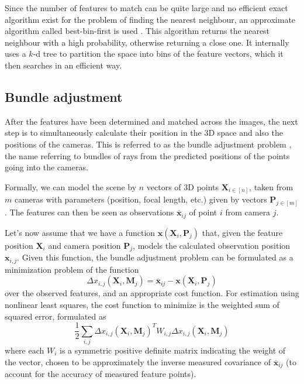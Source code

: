 Since the number of features to match can be quite large and no efficient exact algorithm exist for the problem of finding the nearest neighbour, an approximate algorithm called best-bin-first is used \cite{beis1997shape}.
This algorithm returns the nearest neighbour with a high probability, otherwise returning a close one.
It internally uses a $k$-d tree to partition the space into bins of the feature vectors, which it then searches in an efficient way.

\subsection{Bundle adjustment}
After the features have been determined and matched across the images, the next step is to simultaneously calculate their position in the 3D space and also the positions of the cameras.
This is referred to as the bundle adjustment problem \cite{triggs1999bundle}, the name referring to bundles of rays from the predicted positions of the points going into the cameras.

Formally, we can model the scene by $n$ vectors of 3D points $\mathbf{X}_{i \in [n]}$, taken from $m$ cameras with parameters (position, focal length, etc.) given by vectors $\mathbf{P}_{j \in [m]}$.
The features can then be seen as observations $\overline{\bm{x}}_{ij}$ of point $i$ from camera $j$.

Let's now assume that we have a function $\bm{x}(\mathbf{X}_i, \mathbf{P}_j)$ that, given the feature position $\mathbf{X}_i$ and camera position $\mathbf{P}_j$, models the calculated observation position $\mathbf{x}_{i, j}$.
Given this function, the bundle adjustment problem can be formulated as a minimization problem of the function \begin{equation} \Delta x_{i, j} (\mathbf{X}_i, \mathbf{M}_j) = \overline{\bm{x}}_{ij} - \bm{x}(\mathbf{X}_i, \mathbf{P}_j) \end{equation}
over the observed features, and an appropriate cost function. For estimation using nonlinear least squares, the cost function to minimize is the weighted sum of squared error, formulated as 
\begin{equation} \frac{1}{2} \sum_{i,j} \Delta x_{i, j} (\mathbf{X}_i, \mathbf{M}_j)^T W_{i,j} \Delta x_{i, j} (\mathbf{X}_i, \mathbf{M}_j) \end{equation}
where each $W_i$ is a symmetric positive definite matrix indicating the weight of the vector, chosen to be approximately the inverse measured covariance of $\overline{\bm{x}}_{ij}$ (to account for the accuracy of measured feature points).

